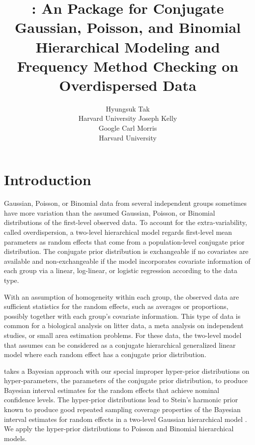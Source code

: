\documentclass[article]{jss}
\author{Hyungsuk Tak\\Harvard University \And 
             Joseph Kelly\\Google\And
             Carl Morris\\ Harvard University}
\title{\pkg{Rgbp}: An \proglang{R} Package for Conjugate Gaussian, Poisson, and Binomial Hierarchical Modeling and Frequency Method Checking on Overdispersed Data}
\begin{document}

\section[Introduction]{Introduction}
Gaussian, Poisson, or Binomial data from several independent groups sometimes have more variation than the assumed Gaussian, Poisson, or Binomial distributions of the first-level observed data. To account for the extra-variability, called overdispersion, a two-level hierarchical model regards first-level mean parameters as random effects that come from a population-level conjugate prior distribution. The conjugate prior distribution is exchangeable if no covariates are available and non-exchangeable if the model incorporates covariate information of each group via a linear, log-linear, or logistic regression according to the data type. 


With an assumption of homogeneity within each group, the observed data are sufficient statistics for the random effects, such as averages or proportions, possibly together with each group's covariate information. This type of  data is common for a biological analysis on litter data, a meta analysis on independent studies, or small area estimation problems.  For these data, the two-level model that  assumes can be considered as a conjugate hierarchical generalized linear model \citep{lee1996hierarchical, hglm2006} where each random effect has a conjugate prior distribution.


 takes a Bayesian approach with our special improper hyper-prior distributions on hyper-parameters, the parameters of the conjugate prior distribution, to produce  Bayesian interval   estimates for the random effects that achieve nominal confidence levels. The hyper-prior distributions lead to Stein's harmonic prior known to produce good repeated sampling coverage properties of the Bayesian interval estimates for random effects in a two-level Gaussian hierarchical model \citep{tang2011, morris2012}.  We apply the hyper-prior distributions to Poisson and Binomial hierarchical models. 
\end{document}
